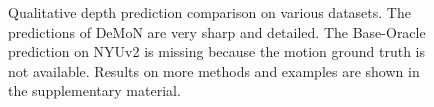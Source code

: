 \documentclass[10pt,twocolumn,letterpaper]{article}
\begin{document}
\begin{figure}
\begin{center}
\end{center}
\vspace{-0.4em}%
\vspace{\capvspace}%
\caption{
 Qualitative depth prediction comparison on various datasets. The predictions of DeMoN are very sharp and detailed.
The Base-Oracle prediction on NYUv2 is missing because the motion ground truth is not available. 
Results on more methods and examples are shown in the supplementary material. %
}
\label{fig:depth_comparison}
\vspace{\figvspace}
\vspace{-0.5em}
\end{figure}
\end{document}

